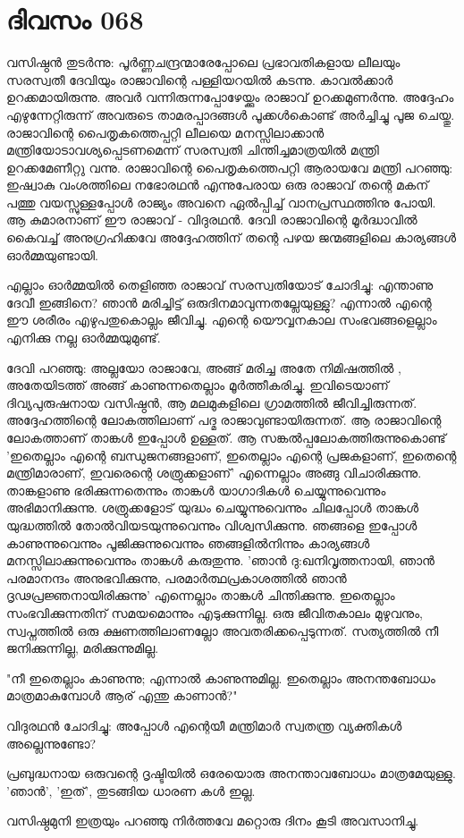  
\section{ദിവസം 068}


വസിഷ്ഠന്‍ തുടര്‍ന്നു: പൂര്‍ണ്ണചന്ദ്രന്മാരേപ്പോലെ പ്രഭാവതികളായ ലീലയും സരസ്വതീ ദേവിയും രാജാവിന്റെ പള്ളിയറയില്‍ കടന്നു. കാവല്‍ക്കാര്‍ ഉറക്കമായിരുന്നു. അവര്‍ വന്നിരുന്നപ്പോഴേയ്ക്കും രാജാവ്‌ ഉറക്കമുണര്‍ന്നു. അദ്ദേഹം എഴുന്നേറ്റിരുന്ന് അവരുടെ താമരപ്പാദങ്ങള്‍ പൂക്കള്‍കൊണ്ട്‌ അര്‍ച്ചിച്ചു പൂജ ചെയ്തു. രാജാവിന്റെ പൈതൃകത്തെപ്പറ്റി ലീലയെ മനസ്സിലാക്കാന്‍ മന്ത്രിയോടാവശ്യപ്പെടണമെന്ന് സരസ്വതി ചിന്തിച്ചമാത്രയില്‍ മന്ത്രി ഉറക്കമേണീറ്റു വന്നു. രാജാവിന്റെ പൈതൃകത്തെപറ്റി ആരായവേ മന്ത്രി പറഞ്ഞു: ഇഷ്വാകു വംശത്തിലെ നഭോരഥന്‍ എന്നുപേരായ ഒരു രാജാവ്‌ തന്റെ മകന്‌ പത്തു വയസ്സുള്ളപ്പോള്‍ രാജ്യം അവനെ ഏല്‍പ്പിച്ച്‌ വാനപ്രസ്ഥത്തിനു പോയി. ആ കുമാരനാണ്‌ ഈ രാജാവ്‌ - വിദുരഥന്‍. ദേവി രാജാവിന്റെ മൂര്‍ദ്ധാവില്‍ കൈവച്ച്‌ അനുഗ്രഹിക്കവേ അദ്ദേഹത്തിന്‌ തന്റെ പഴയ ജന്മങ്ങളിലെ കാര്യങ്ങള്‍ ഓര്‍മ്മയുണ്ടായി. 

എല്ലാം ഓര്‍മ്മയില്‍ തെളിഞ്ഞ രാജാവ്‌ സരസ്വതിയോട്‌ ചോദിച്ചു: എന്താണു ദേവീ ഇങ്ങിനെ? ഞാന്‍ മരിച്ചിട്ട്‌ ഒരുദിനമാവുന്നതല്ലേയുള്ളു? എന്നാല്‍ എന്റെ ഈ ശരീരം എഴുപതുകൊല്ലം ജീവിച്ചു. എന്റെ യൌവ്വനകാല സംഭവങ്ങളെല്ലാം എനിക്കു നല്ല ഓര്‍മ്മയുമുണ്ട്‌.

ദേവി പറഞ്ഞു: അല്ലയോ രാജാവേ, അങ്ങ്‌ മരിച്ച അതേ നിമിഷത്തില്‍ , അതേയിടത്ത്‌ അങ്ങ്‌ കാണുന്നതെല്ലാം മൂര്‍ത്തീകരിച്ചു. ഇവിടെയാണ്‌ ദിവ്യപുരുഷനായ വസിഷ്ഠന്‍, ആ മലമുകളിലെ ഗ്രാമത്തില്‍ ജീവിച്ചിരുന്നത്‌. അദ്ദേഹത്തിന്റെ ലോകത്തിലാണ്‌ പദ്മ രാജാവുണ്ടായിരുന്നത്‌. ആ രാജാവിന്റെ ലോകത്താണ്‌ താങ്കള്‍ ഇപ്പോള്‍ ഉള്ളത്‌. ആ സങ്കല്‍പ്പലോകത്തിരുന്നുകൊണ്ട്‌ 'ഇതെല്ലാം എന്റെ ബന്ധുജനങ്ങളാണ്‌, ഇതെല്ലാം എന്റെ പ്രജകളാണ്‌, ഇതെന്റെ മന്ത്രിമാരാണ്‌, ഇവരെന്റെ ശത്രുക്കളാണ്‌' എന്നെല്ലാം അങ്ങു വിചാരിക്കുന്നു. താങ്കളാണു ഭരിക്കുന്നതെന്നും താങ്കള്‍ യാഗാദികള്‍ ചെയ്യുന്നുവെന്നും അഭിമാനിക്കുന്നു. ശത്രുക്കളോട്‌ യുദ്ധം ചെയ്യുന്നുവെന്നും ചിലപ്പോള്‍ താങ്കള്‍ യുദ്ധത്തില്‍ തോല്‍വിയടയുന്നുവെന്നും വിശ്വസിക്കുന്നു. ഞങ്ങളെ ഇപ്പോള്‍ കാണുന്നുവെന്നും പൂജിക്കുന്നുവെന്നും ഞങ്ങളില്‍നിന്നും കാര്യങ്ങള്‍ മനസ്സിലാക്കുന്നുവെന്നും താങ്കള്‍ കരുതുന്നു. 'ഞാന്‍ ദു:ഖനിവൃത്തനായി, ഞാന്‍ പരമാനന്ദം അനുഭവിക്കുന്നു, പരമാര്‍ത്ഥപ്രകാശത്തില്‍ ഞാന്‍ ദൃഢപ്രജ്ഞനായിരിക്കുന്നു' എന്നെല്ലാം താങ്കള്‍ ചിന്തിക്കുന്നു. ഇതെല്ലാം സംഭവിക്കുന്നതിന്‌ സമയമൊന്നും എടുക്കുന്നില്ല. ഒരു ജീവിതകാലം മുഴുവനും, സ്വപ്നത്തില്‍ ഒരു ക്ഷണത്തിലാണല്ലോ അവതരിക്കപ്പെടുന്നത്‌. സത്യത്തില്‍ നീ ജനിക്കുന്നില്ല, മരിക്കുന്നുമില്ല.

"നീ ഇതെല്ലാം കാണുന്നു; എന്നാല്‍ കാണുന്നുമില്ല. ഇതെല്ലാം അനന്തബോധം മാത്രമാകുമ്പോള്‍ ആര്‌ എന്തു കാണാന്‍?"

വിദുരഥന്‍ ചോദിച്ചു: അപ്പോള്‍ എന്റെയീ മന്ത്രിമാര്‍ സ്വതന്ത്ര വ്യക്തികള്‍ അല്ലെന്നുണ്ടോ?

പ്രബുദ്ധനായ ഒരുവന്റെ ദൃഷ്ടിയില്‍ ഒരേയൊരു അനന്താവബോധം മാത്രമേയുള്ളു. 'ഞാന്‍', 'ഇത്‌', തുടങ്ങിയ ധാരണ   കള്‍ ഇല്ല.

വസിഷ്ഠമുനി ഇത്രയും പറഞ്ഞു നിര്‍ത്തവേ മറ്റൊരു ദിനം കൂടി അവസാനിച്ചു.

